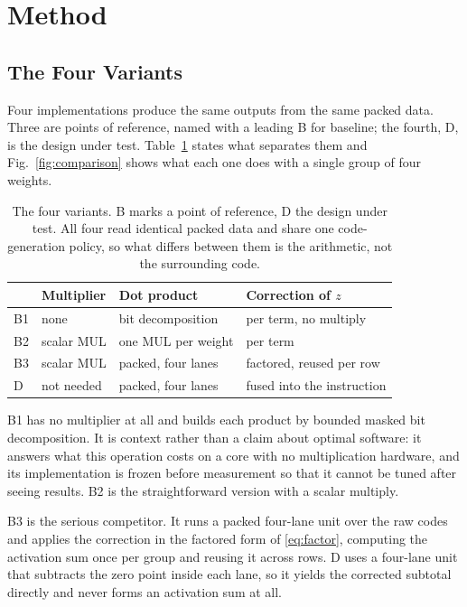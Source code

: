 \section{Method}
\subsection{The Four Variants}
Four implementations produce the same outputs from the same packed data. Three
are points of reference, named with a leading B for baseline; the fourth, D, is
the design under test. Table~\ref{tab:variants} states what separates them and
Fig.~\ref{fig:comparison} shows what each one does with a single group of four
weights.

\begin{table}[!htbp]
\caption{The four variants. B marks a point of reference, D the design under
test. All four read identical packed data and share one code-generation policy,
so what differs between them is the arithmetic, not the surrounding code.}
\label{tab:variants}
\centering
\footnotesize
\begin{tabular}{llll}
\hline
 & Multiplier & Dot product & Correction of $z$ \\
\hline
B1 & none & bit decomposition & per term, no multiply \\
B2 & scalar MUL & one MUL per weight & per term \\
B3 & scalar MUL & packed, four lanes & factored, reused per row \\
D & not needed & packed, four lanes & fused into the instruction \\
\hline
\end{tabular}
\end{table}

B1 has no multiplier at all and builds each product by bounded masked bit
decomposition. It is context rather than a claim about optimal software: it
answers what this operation costs on a core with no multiplication hardware,
and its implementation is frozen before measurement so that it cannot be tuned
after seeing results. B2 is the straightforward version with a scalar multiply.

B3 is the serious competitor. It runs a packed four-lane unit over the raw
codes and applies the correction in the factored form of \eqref{eq:factor},
computing the activation sum once per group and reusing it across rows. D uses
a four-lane unit that subtracts the zero point inside each lane, so it yields
the corrected subtotal directly and never forms an activation sum at all.

